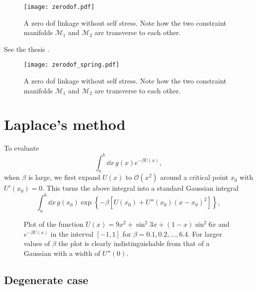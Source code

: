 \begin{figure}
  \begin{center}
    \texttt{[image: zerodof.pdf]}
  \end{center}
\caption{A zero \ac{dof} linkage without self stress.  Note how the two constraint manifolds $\mathcal{M}_1$ and $\mathcal{M}_2$ are transverse to each other.}
  \label{fig:hello}
\end{figure}

See the thesis \cite{lengyel2002}.

\begin{figure}
  \begin{center}
    \texttt{[image: zerodof\_spring.pdf]}
  \end{center}
\caption[foo]{A zero \ac{dof} linkage without self stress.  Note how the two constraint manifolds $\mathcal{M}_1$ and $\mathcal{M}_2$ are transverse to each other.}
  \label{fig:hello2}
\end{figure}
\pagebreak

\section{Laplace's method}

To evaluate
%
\begin{equation}
  \int_{a}^{b} \dd{x}\, g(x) e^{-\beta U(x)},
\end{equation}
when $\beta$ is large, we first expand $U(x)$ to $\mathcal{O}(x^{2})$ around a critical point $x_{0}$ with $U'(x_{0}) = 0$.
This turns the above integral into a standard Gaussian integral
%
\begin{equation}
  \int_{a}^{b} \dd{x}\, g(x_{0}) \exp\left\{-\beta\left[U(x_{0}) +  U''(x_{0})(x-x_{0})^{2}\right]\right\},
\end{equation}

\begin{figure}
  \caption{Plot of the function $U(x) = 9x^{2} + \sin^{2}{3x} + (1-x)\sin^{2}{6x}$ and $e^{-\beta U(x)}$ in the interval $[-1,1]$ for $\beta = 0.1, 0.2, \ldots, 6.4$.  For larger values of $\beta$ the plot is clearly indistinguishable from that of a Gaussian with a width of $U''(0)$.}
  \label{fig:}
\end{figure}

\subsection{Degenerate case}

